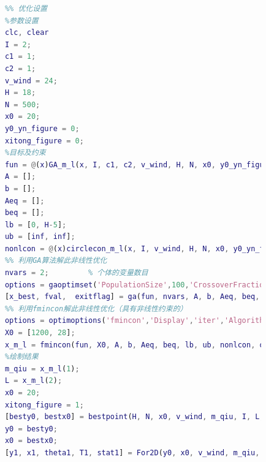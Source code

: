             \begin{lstlisting}[language = Matlab]
            %% 此文件用于求解第三问，最优m_qiu、L和I使单一目标最小
            %% 优化设置
            %参数设置
            clc, clear
            I = 2;
            c1 = 1;
            c2 = 1;
            v_wind = 24;
            H = 18;
            N = 500;
            x0 = 20;
            y0_yn_figure = 0;
            xitong_figure = 0;
            %目标及约束
            fun = @(x)GA_m_l(x, I, c1, c2, v_wind, H, N, x0, y0_yn_figure, xitong_figure);
            A = [];
            b = [];
            Aeq = [];
            beq = [];
            lb = [0, H-5];
            ub = [inf, inf];
            nonlcon = @(x)circlecon_m_l(x, I, v_wind, H, N, x0, y0_yn_figure, xitong_figure);
            %% 利用GA算法解此非线性优化
            nvars = 2;         % 个体的变量数目
            options = gaoptimset('PopulationSize',100,'CrossoverFraction',0.75,'Generations',20,'StallGenLimit',40,'PlotFcns',{@gaplotbestf,@gaplotbestindiv}); %参数设置
            [x_best, fval,  exitflag] = ga(fun, nvars, A, b, Aeq, beq, lb, ub, nonlcon, options);
            %% 利用fmincon解此非线性优化（具有非线性约束的）
            options = optimoptions('fmincon','Display','iter','Algorithm','sqp');
            X0 = [1200, 28];
            x_m_l = fmincon(fun, X0, A, b, Aeq, beq, lb, ub, nonlcon, options);
            %绘制结果
            m_qiu = x_m_l(1);
            L = x_m_l(2);
            x0 = 20;
            xitong_figure = 1;
            [besty0, bestx0] = bestpoint(H, N, x0, v_wind, m_qiu, I, L, y0_yn_figure);
            y0 = besty0;
            x0 = bestx0;
            [y1, x1, theta1, T1, stat1] = For2D(y0, x0, v_wind, m_qiu, I, L, xitong_figure);
            \end{lstlisting}
